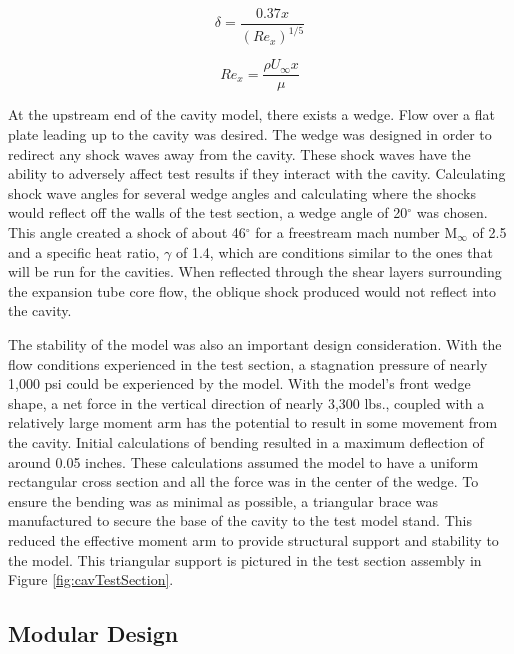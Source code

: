 \begin{equation}
\delta = \frac{0.37x}{(Re_x)^{1/5}}
\label{eq:BL}
\end{equation}

\begin{equation}
Re_x = \frac{\rho U_\infty x}{\mu}
\label{eq:Re}
\end{equation}

At the upstream end of the cavity model, there exists a wedge. Flow over a flat plate leading up to the cavity was desired. The wedge was designed in order to redirect any shock waves away from the cavity. These shock waves have the ability to adversely affect test results if they interact with the cavity. Calculating shock wave angles for several wedge angles and calculating where the shocks would reflect off the walls of the test section, a wedge angle of 20$^\circ$ was chosen. This angle created a shock of about 46$^\circ$ for a freestream mach number M$_\infty$ of 2.5 and a specific heat ratio, $\gamma$ of 1.4, which are conditions similar to the ones that will be run for the cavities. When reflected through the shear layers surrounding the expansion tube core flow, the oblique shock produced would not reflect into the cavity.

The stability of the model was also an important design consideration. With the flow conditions experienced in the test section, a stagnation pressure of nearly 1,000 psi could be experienced by the model. With the model's front wedge shape, a net force in the vertical direction of nearly 3,300 lbs., coupled with a relatively large moment arm has the potential to result in some movement from the cavity. Initial calculations of bending resulted in a maximum deflection of around 0.05 inches. These calculations assumed the model to have a uniform rectangular cross section and all the force was in the center of the wedge. To ensure the bending was as minimal as possible, a triangular brace was manufactured to secure the base of the cavity to the test model stand. This reduced the effective moment arm to provide structural support and stability to the model. This triangular support is pictured in the test section assembly in Figure \ref{fig:cavTestSection}.


\subsection{Modular Design}

